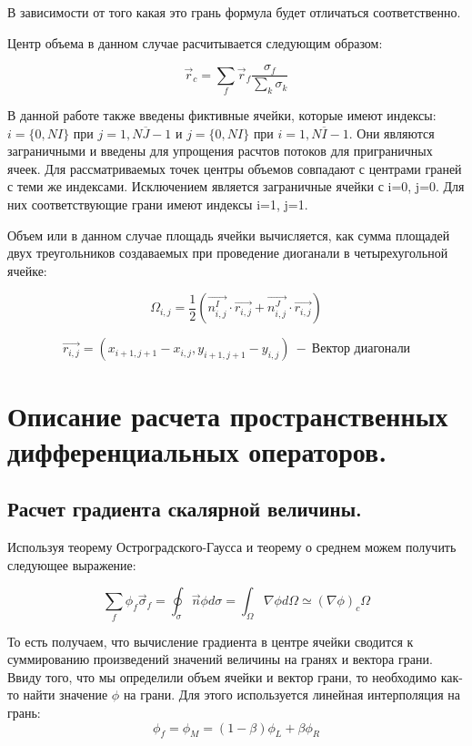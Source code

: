 В зависимости от того какая это грань формула будет отличаться соответственно.

Центр объема в данном случае расчитывается следующим образом:

\begin{equation}
    \vec{r}_c = \sum_f \vec{r}_f \frac{\sigma_f}{\sum_k\sigma_k}
\end{equation}

В данной работе также введены фиктивные ячейки, которые имеют индексы: $i=\{0,NI\}$ при $j=\overline{1,NJ-1}$ и $j=\{0,NI\}$ при $i=\overline{1,NI-1}$. Они являются заграничными и введены для упрощения расчтов потоков для приграничных ячеек. Для рассматриваемых точек центры объемов совпадают с центрами граней с теми же индексами. Исключением является заграничные ячейки с i=0, j=0. Для них соответствующие грани имеют индексы i=1, j=1.

Объем или в данном случае площадь ячейки вычисляется, как сумма площадей двух треугольников создаваемых при проведение диоганали в четырехугольной ячейке:

\begin{equation}
    \Omega_{i,j} = \frac{1}{2}(\vec{n^I_{i,j}}\cdot\vec{r_{i,j}}+\vec{n^J_{i,j}}\cdot\vec{r_{i,j}})
\end{equation}

$$\vec{r_{i,j}} = (x_{i+1, j+1}-x_{i,j}, y_{i+1, j+1}-y_{i,j})~-~\text{Вектор диагонали}$$


\section{Описание расчета пространственных дифференциальных операторов.}
\subsection{Расчет градиента скалярной величины.}
Используя теорему Остроградского-Гаусса и теорему о среднем можем получить следующее выражение:

\begin{equation}
    \sum_f \phi_f \vec{\sigma}_f = \oint_\sigma\vec{n}\phi d\sigma = \int_\Omega \nabla\phi d\Omega \simeq (\nabla \phi)_c\Omega
\end{equation}

То есть получаем, что вычисление градиента в центре ячейки сводится к суммированию произведений значений величины на гранях и вектора грани.
Ввиду того, что мы определили объем ячейки и вектор грани, то необходимо как-то найти значение $\phi$ на грани. Для этого используется линейная интерполяция на грань: 
\begin{equation}
    \phi_f = \phi_M = (1-\beta)\phi_L+\beta\phi_R
\end{equation}

